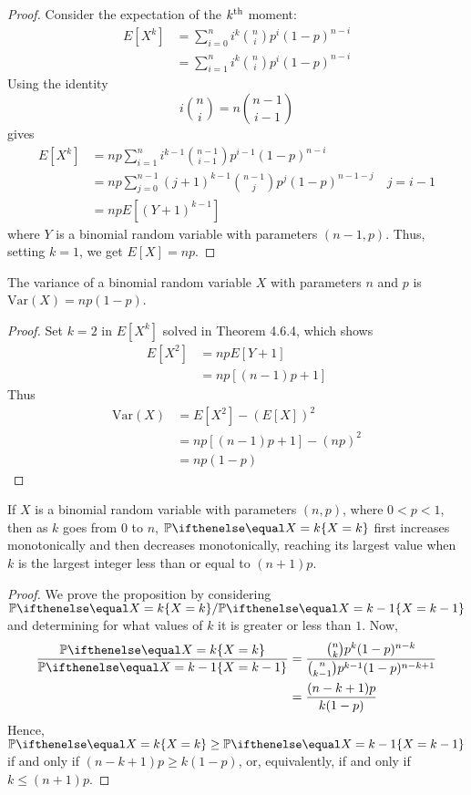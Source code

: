 \documentclass[a4paper,8pt]{article}
\begin{document}
\begin{outline}
    \begin{proof}
      Consider the expectation of the \(k\textsuperscript{th}\) moment:
      \begin{align*}
        E[X^k] &= \sum_{i=0}^ni^k\binom{n}{i}p^i(1-p)^{n-i} \\
               &= \sum_{i=1}^ni^k\binom{n}{i}p^i(1-p)^{n-i}
      \end{align*}
      Using the identity \[ i\binom{n}{i} = n\binom{n-1}{i-1}\] gives
      \begin{align*}
        E[X^k] &= np\sum_{i=1}^ni^{k-1}\binom{n-1}{i-1}p^{i-1}(1-p)^{n-i} \\
               &= np\sum_{j=0}^{n-1}(j+1)^{k-1}\binom{n-1}{j}p^j(1-p)^{n-1-j}\quad j=i-1 \\
               &= npE[(Y+1)^{k-1}]
      \end{align*}
      where \(Y\) is a binomial random variable with parameters \((n-1, p)\). Thus,
      setting \(k=1\), we get \(E[X] = np\).
    \end{proof}

    The variance of a binomial random variable \(X\) with parameters \(n\) and \(p\) is \(\text{Var}(X) = np(1-p)\).

    \begin{proof}
      Set \(k = 2\) in \(E[X^k]\) solved in Theorem 4.6.4, which shows
      \begin{align*}
        E[X^2] &= npE[Y+1] \\
               &= np[(n-1)p + 1]
      \end{align*}
      Thus
      \begin{align*}
        \text{Var}(X) &= E[X^2] - (E[X])^2 \\
                      &= np[(n-1)p+1] - (np)^2 \\
                      &= np(1-p)
      \end{align*}
    \end{proof}

    If \(X\) is a binomial random variable with parameters \((n, p)\), where \(0 < p < 1\), then as \(k\) goes
    from \(0\) to \(n\), \(\bbp[X=k]\) first increases monotonically and then decreases monotonically, reaching
    its largest value when \(k\) is the largest integer less than or equal to \((n+1)p\).

    \begin{proof}
      We prove the proposition by considering \(\bbp[X=k]/\bbp[X=k-1]\) and determining for what values of
      \(k\) it is greater or less than \(1\). Now,
      \begin{align}
        \frac{\bbp[X=k]}{\bbp[X=k-1]} &= \frac{\binom{n}{k}p^k(1-p)^{n-k}}
                                              {\binom{n}{k-1}p^{k-1}(1-p)^{n-k+1}}\nonumber \\
                                      &= \frac{(n-k+1)p}{k(1-p)}
      \end{align}
      Hence, \(\bbp[X=k] \geq \bbp[X=k-1]\) if and only if \((n-k+1)p \geq k(1-p)\), or, equivalently, if and only
      if \(k \leq (n+1)p\).
    \end{proof}


\end{outline}
\end{document}
